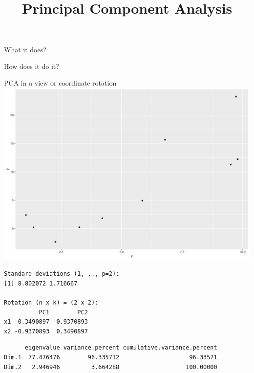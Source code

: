 \documentclass[
  ignorenonframetext,
]{beamer}
\title{Principal Component Analysis}
\author{}
\date{}
\begin{document}
\frame{\titlepage}
\ifdefined\Shaded\renewenvironment{Shaded}{\begin{tcolorbox}[breakable, frame hidden, interior hidden, enhanced, borderline west={3pt}{0pt}{shadecolor}, sharp corners, boxrule=0pt]}{\end{tcolorbox}}\fi

\begin{frame}{What it does?}
\protect\hypertarget{what-it-does}{}
\end{frame}

\begin{frame}{How does it do it?}
\protect\hypertarget{how-does-it-do-it}{}
\end{frame}

\begin{frame}[fragile]{PCA in a view or coordinate rotation}
\protect\hypertarget{pca-in-a-view-or-coordinate-rotation}{}
\includegraphics{note9_files/figure-beamer/unnamed-chunk-1-1.pdf}

\begin{verbatim}
Standard deviations (1, .., p=2):
[1] 8.802072 1.716667

Rotation (n x k) = (2 x 2):
          PC1        PC2
x1 -0.3490897 -0.9370893
x2 -0.9370893  0.3490897
\end{verbatim}

\begin{verbatim}
      eigenvalue variance.percent cumulative.variance.percent
Dim.1  77.476476        96.335712                    96.33571
Dim.2   2.946946         3.664288                   100.00000
\end{verbatim}


\end{frame}
\end{document}
